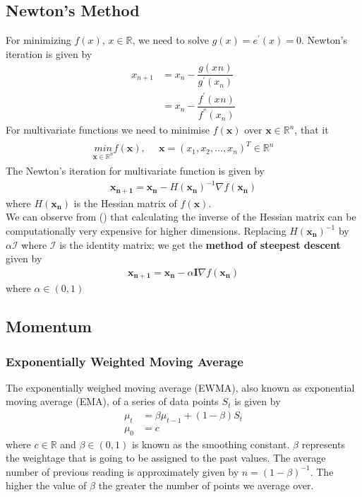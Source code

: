 \subsection*{Newton's Method}
For minimizing $f(x)$, $x \in \mathbb{R}$, we need to solve $g(x) = e^{'}(x)=0$. Newton's iteration is given by 
\begin{align}
  x_{n+1} &= x_{n} - \dfrac{g(x_{}n)}{g^{'}(x_n)} \\
          &= x_{n} - \dfrac{f^{'}(x_{}n)}{f^{''}(x_n)}
\end{align}
For multivariate functions we need to minimise $f(\mathbf{x})$ over $\mathbf{x} \in \mathbb{R}^n$, that it
\begin{align}
  \begin{matrix}
    \underset{\mathbf{x}\in\mathbb{R}^n}{min} f(\mathbf{x}), & \,\,\, \mathbf{x} =(x_1,x_2,\dots,x_n)^T \in \mathbb{R}^n
  \end{matrix} 
\end{align}
The Newton's iteration for multivariate function is given by
\begin{align}
  \mathbf{x_{n+1}} = \mathbf{x_{n}} - H(\mathbf{x_n})^{-1}\nabla f(\mathbf{x_n})
\end{align}
where $H(\mathbf{x_n})$ is the Hessian matrix of $f(\mathbf{x})$.\\
\noindent We can observe from () that calculating the inverse of the Hessian matrix can be computationally very expensive for higher dimensions. Replacing $H(\mathbf{x_n})^{-1}$ by $\alpha \mathcal{I}$ where $\mathcal{I}$ is the identity matrix; we get the \textbf{method of steepest descent} given by
\begin{align}
  \mathbf{x_{n+1}} = \mathbf{x_{n}} - \alpha \textbf{I} \nabla f(\mathbf{x_n})
\end{align}
where $\alpha \in (0,1)$
\subsection*{Momentum}
\subsubsection*{Exponentially Weighted Moving Average}
The exponentially weighed moving average (EWMA), also known as exponential moving average (EMA), of a series of data points $S_t$ is given by 
\begin{align}
    \label{eq:ewma_def}
    \mu_t &= \beta \mu_{t-1} + (1-\beta)S_t \\
    \nonumber
    \mu_0 &= c
\end{align}
where $c \in \mathbb{R}$ and $\beta \in (0,1)$ is known as the smoothing constant. $\beta$ represents the weightage that is going to be assigned to the past values. The average number of previous reading is approximately given by $n={(1-\beta)}^{-1}$. The higher the value of $\beta$ the greater the number of points we average over.
